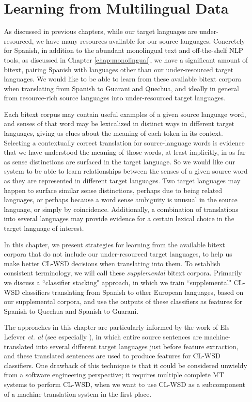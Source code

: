 \chapter{Learning from Multilingual Data}
\label{chap:multilingual}
As discussed in previous chapters, while our target languages are
under-resourced, we have many resources available for our source languages.
Concretely for Spanish, in addition to the abundant monolingual text and
off-the-shelf NLP tools, as discussed in Chapter \ref{chap:monolingual}, we
have a significant amount of bitext, pairing Spanish with languages other than
our under-resourced target languages. We would like to be able to learn from
these available bitext corpora when translating from Spanish to Guarani and
Quechua, and ideally in general from resource-rich source languages into
under-resourced target languages.

Each bitext corpus may contain useful examples of a given source language word,
and senses of that word may be lexicalized in distinct ways in different target
languages, giving us clues about the meaning of each token in its context.
Selecting a contextually correct translation for source-language words is
evidence that we have understood the meaning of those words, at least
implicitly, in as far as sense distinctions are surfaced in the target
language. So we would like our system to be able to learn relationships between
the senses of a given source word as they are represented in different target
languages. Two target languages may happen to surface similar sense
distinctions, perhaps due to being related languages, or perhaps because a word
sense ambiguity is unusual in the source language, or simply by coincidence.
Additionally, a combination of translations into several languages may provide
evidence for a certain lexical choice in the target language of interest.

In this chapter, we present strategies for learning from the available bitext
corpora that do not include our under-resourced target languages, to help us
make better CL-WSD decisions when translating into them. To establish
consistent terminology, we will call these \emph{supplemental} bitext corpora.
Primarily we discuss a ``classifier stacking" approach, in which we train
``supplemental" CL-WSD classifiers translating from Spanish to other European
languages, based on our supplemental corpora, and use the outputs of these
classifiers as features for Spanish to Quechua and Spanish to Guarani.

The approaches in this chapter are particularly informed by the work of Els
Lefever \emph{et. al} (see especially
\cite{lefever-hoste-decock:2011:ACL-HLT2011}), in which entire source sentences
are machine-translated into several different target languages just before
feature extraction, and these translated sentences are used to produce features
for CL-WSD classifiers. One drawback of this technique is that it could be
considered unwieldy from a software engineering perspective; it requires
multiple complete MT systems to perform CL-WSD, when we want to use CL-WSD as a
subcomponent of a machine translation system in the first place.

